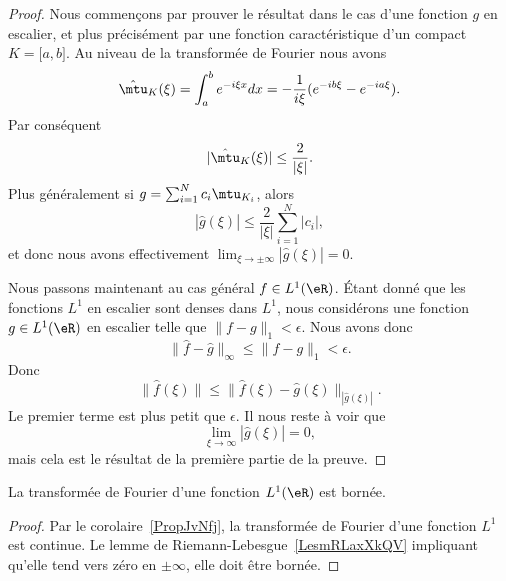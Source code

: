 \begin{proof}
    Nous commençons par prouver le résultat dans le cas d'une fonction \( g\) en escalier, et plus précisément par une fonction caractéristique d'un compact \( K=\mathopen[ a , b \mathclose]\). Au niveau de la transformée de Fourier nous avons
    \begin{equation}
        \hat\mtu_{K}(\xi)=\int_a^b e^{-i\xi x}dx=-\frac{1}{ i\xi }( e^{-ib\xi}- e^{-ia\xi}).
    \end{equation}
    Par conséquent
    \begin{equation}
        | \hat\mtu_K(\xi) |\leq \frac{ 2 }{ | \xi | }.
    \end{equation}
    Plus généralement si \( g=\sum_{i=1}^Nc_i\mtu_{K_i}\), alors
    \begin{equation}
        | \hat g(\xi) |\leq \frac{ 2 }{ | \xi | }\sum_{i=1}^N| c_i |,
    \end{equation}
    et donc nous avons effectivement \( \lim_{\xi\to\pm\infty}| \hat g(\xi) |=0\).

    Nous passons maintenant au cas général \( f\in L^1(\eR)\). Étant donné que les fonctions \( L^1\) en escalier sont denses dans \( L^1\), nous considérons une fonction \( g\in L^1(\eR)\) en escalier telle que \( \| f-g \|_1<\epsilon\). Nous avons donc
    \begin{equation}
        \| \hat f-\hat g \|_{\infty}\leq \| f-g \|_1<\epsilon.
    \end{equation}
    Donc
    \begin{equation}
        \| \hat f(\xi) \|\leq \| \hat f(\xi)-\hat g(\xi) \|_| \hat g(\xi) |.
    \end{equation}
    Le premier terme est plus petit que \( \epsilon\). Il nous reste à voir que
    \begin{equation}
        \lim_{\xi\to \infty} | \hat g(\xi) |=0,
    \end{equation}
    mais cela est le résultat de la première partie de la preuve.
\end{proof}

\begin{corollary}       \label{CORooHSNYooZlZoyV}
    La transformée de Fourier d'une fonction \( L^1(\eR)\) est bornée.
\end{corollary}

\begin{proof}
    Par le corolaire~\ref{PropJvNfj}, la transformée de Fourier d'une fonction \( L^1\) est continue. Le lemme de Riemann-Lebesgue~\ref{LesmRLaxXkQV} impliquant qu'elle tend vers zéro en \( \pm\infty\), elle doit être bornée.
\end{proof}

